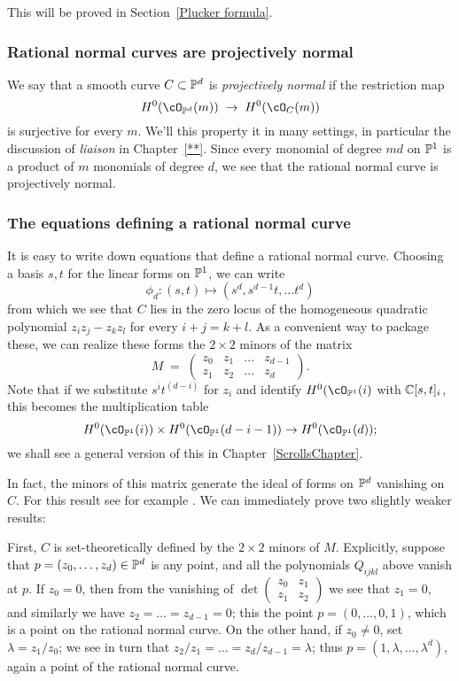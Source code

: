 This will be proved in Section~\ref{Plucker formula}.

\subsubsection{Rational normal curves are projectively normal}


We say that a smooth curve $C \subset \PP^d$ is \emph{projectively normal} if the restriction map
$$
H^0(\cO_{\PP^d}(m)) \; \to \; H^0(\cO_{C}(m)) 
$$
is surjective for every $m$. We'll this property it in many settings, in particular the discussion of \emph{liaison} in Chapter~\ref{**}.
Since every monomial of degree $md$ on $\PP^1$ is a product of $m$ monomials of degree $d$, we see that the rational normal curve is projectively normal. 


\subsubsection{The equations defining a rational normal curve}
It is easy to write down equations that define a rational normal curve. Choosing a basis $s,t$ for the linear forms on $\PP^1$, we can write
$$
\phi_d : (s,t) \mapsto (s^d, s^{d-1}t,\dots t^d)
$$
from which we see that $C$ lies in the zero locus of the homogeneous quadratic polynomial $z_iz_j - z_kz_l$ for every $i+j=k+l$. As a convenient way to package these, we can realize these forms the $2\times 2$ minors of the matrix
$$
M \; = \; \begin{pmatrix}
z_0 & z_1 & \dots & z_{d-1} \\
z_1 & z_2 & \dots & z_d
\end{pmatrix}.
$$
Note that if we substitute $s^it^{(d-i)}$ for $z_i$ and identify $H^0(\cO_{\PP^1}(i)$ with $\CC[s,t]_i$, this becomes the multiplication table
$$
H^0(\cO_{\PP^1}(i)) \times H^0(\cO_{\PP^1}(d-i-1)) \to H^0(\cO_{\PP^1}(d));
$$
we shall see a general version of this in Chapter~\ref{ScrollsChapter}. 

In fact, the minors of this matrix generate the ideal of forms on $\PP^d$ vanishing on $C$. For this result see for example \cite[****]{E}. 
We can immediately prove two slightly weaker results:

First, $C$ is set-theoretically defined by the $2\times 2$ minors of $M$. Explicitly, suppose that $p = (z_0,\dots,z_d) \in \PP^d$ is any point, and all the polynomials $Q_{ijkl}$ above vanish at $p$. If $z_0 = 0$, then from the vanishing of 
$\det \begin{pmatrix}
z_0 & z_1  \\
z_1 & z_2 
\end{pmatrix}$ 
we see that $z_1 = 0$, and similarly we have $z_2 = \dots = z_{d-1}=0$; this the point $p = (0,\dots,0,1)$, which is a point on the rational normal curve. On the other hand, if $z_0 \neq 0$, set $\lambda = z_1/z_0$; we see in turn that $z_2/z_1 = \dots = z_d/z_{d-1} = \lambda$; thus $p = (1, \lambda, \dots,\lambda^d)$, again a point of the rational normal curve.

